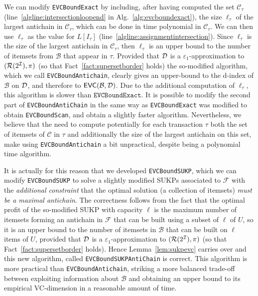 We can modify \texttt{EVCBoundExact} by including, after having computed the
set $\mathcal{C}_\tau$ (line~\ref{algline:intersectionloopend} in
Alg.~\ref{alg:evcboundexact}), the size $\ell_\tau$ of the largest antichain in
$\mathcal{C}_\tau$, which can be done in time polynomial in $\mathcal{C}_\tau$.
We can then use $\ell_\tau$ as the value for $L[I_\tau]$
(line~\ref{algline:assignmentintersection}). Since $\ell_\tau$ is the size of
the largest antichain in $\mathcal{C}_\tau$, then $\ell_\tau$ is an upper bound
to the number of itemsets from $\mathcal{B}$ that appear in $\tau$. Provided
that ${\cal D}$ is a $\varepsilon_1$-approximation to $(\mathcal{R}(2^{\cal I}),\pi)$ (so
that Fact~\ref{fact:supersetborder} holds) the so-modified algorithm, which we
call \texttt{EVCBoundAntichain}, clearly gives an upper-bound to the d-index of
$\mathcal{B}$ on ${\cal D}$, and therefore to $\mathsf{EVC}(\mathcal{B},{\cal D})$. Due to the
additional computation of $\ell_\tau$, this algorithm is slower than
$\texttt{EVCBoundExact}$. It is possible to modify the second part of
\texttt{EVCBoundAntiChain} in the same way as \texttt{EVCBoundExact} was
modified to obtain \texttt{EVCBoundScan}, and obtain a slightly faster
algorithm. Nevertheless, we believe that the need to compute potentially for
each transaction $\tau$ both the set of itemsets of $\mathcal{C}$ in $\tau$ and
additionally the size of the largest antichain on this set, make using
\texttt{EVCBoundAntichain} a bit unpractical, despite being a polynomial time
algorithm.

It is actually for this reason that we developed \texttt{EVCBoundSUKP}, which we
can modify \texttt{EVCBoundSUKP} to solve a slightly modified SUKPs associated
to $\mathcal{F}$ with the \emph{additional constraint} that the optimal solution
(a collection of itemsets) \emph{must be a maximal antichain}. The correctness
follows from the fact that the optimal profit of the so-modified SUKP with
capacity $\ell$ is the maximum number of itemsets forming an antichain in
$\mathcal{F}$ that can be built using a subset of $\ell$ of $U$, so it is an
upper bound to the number of itemsets in $\mathcal{B}$ that can be built on
$\ell$ items of $U$, provided that ${\cal D}$ is a $\varepsilon_1$-approximation to
$(\mathcal{R}(2^{\cal I}),\pi)$ (so that Fact~\ref{fact:supersetborder} holds). Hence
Lemma~\ref{lem:sukpevc} carries over and this new algorithm, called
\texttt{EVCBoundSUKPAntiChain} is correct. This algorithm is more practical than
\texttt{EVCBoundAntichain}, striking a more balanced trade-off between
exploiting information about $\mathcal{B}$ and obtaining an upper bound to its
empirical VC-dimension in a reasonable amount of time.